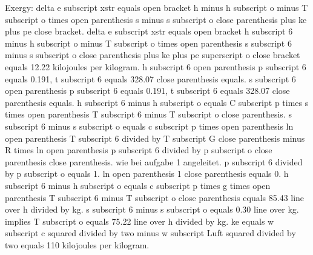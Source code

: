 Exergy:  
delta e subscript xstr equals open bracket h minus h subscript o minus T subscript o times open parenthesis s minus s subscript o close parenthesis plus ke plus pe close bracket.  
delta e subscript xstr equals open bracket h subscript 6 minus h subscript o minus T subscript o times open parenthesis s subscript 6 minus s subscript o close parenthesis plus ke plus pe superscript o close bracket equals 12.22 kilojoules per kilogram.  
h subscript 6 open parenthesis p subscript 6 equals 0.191, t subscript 6 equals 328.07 close parenthesis equals.  
s subscript 6 open parenthesis p subscript 6 equals 0.191, t subscript 6 equals 328.07 close parenthesis equals.  
h subscript 6 minus h subscript o equals C subscript p times s times open parenthesis T subscript 6 minus T subscript o close parenthesis.  
s subscript 6 minus s subscript o equals c subscript p times open parenthesis ln open parenthesis T subscript 6 divided by T subscript G close parenthesis minus R times ln open parenthesis p subscript 6 divided by p subscript o close parenthesis close parenthesis.  
wie bei aufgabe 1 angeleitet.  
p subscript 6 divided by p subscript o equals 1.  
ln open parenthesis 1 close parenthesis equals 0.  
h subscript 6 minus h subscript o equals c subscript p times g times open parenthesis T subscript 6 minus T subscript o close parenthesis equals 85.43 line over h divided by kg.  
s subscript 6 minus s subscript o equals 0.30 line over kg.  
implies T subscript o equals 75.22 line over h divided by kg.  
ke equals w subscript c squared divided by two minus w subscript Luft squared divided by two equals 110 kilojoules per kilogram.
